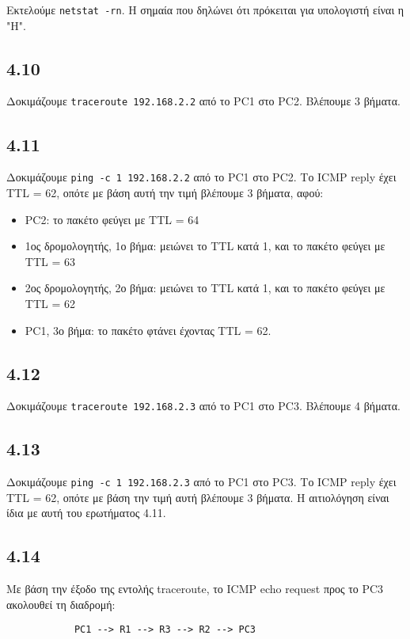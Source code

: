 \documentclass[a4paper, 12pt]{article}
\begin{document}
		Εκτελούμε \verb|netstat -rn|. Η σημαία που δηλώνει ότι πρόκειται για υπολογιστή είναι η "H".

	\subsection*{4.10}
		Δοκιμάζουμε \verb|traceroute 192.168.2.2| από το PC1 στο PC2. Βλέπουμε 3 βήματα.

	\subsection*{4.11}
		Δοκιμάζουμε \verb|ping -c 1 192.168.2.2| από το PC1 στο PC2. Το ICMP reply έχει TTL = 62, οπότε με βάση αυτή την τιμή βλέπουμε 3 βήματα, αφού:

		\begin{itemize}
			\item PC2: το πακέτο φεύγει με TTL = 64
			\item 1ος δρομολογητής, 1ο βήμα: μειώνει το TTL κατά 1, και το πακέτο φεύγει με TTL = 63
			\item 2ος δρομολογητής, 2ο βήμα: μειώνει το TTL κατά 1, και το πακέτο φεύγει με TTL = 62
			\item PC1, 3ο βήμα: το πακέτο φτάνει έχοντας TTL = 62.
		\end{itemize}
		
	\subsection*{4.12}
		Δοκιμάζουμε \verb|traceroute 192.168.2.3| από το PC1 στο PC3. Βλέπουμε 4 βήματα.

	\subsection*{4.13}
		Δοκιμάζουμε \verb|ping -c 1 192.168.2.3| από το PC1 στο PC3. Το ICMP reply έχει TTL = 62, οπότε με βάση την τιμή αυτή βλέπουμε 3 βήματα. Η αιτιολόγηση είναι ίδια με αυτή του ερωτήματος 4.11.

	\subsection*{4.14}
		Με βάση την έξοδο της εντολής traceroute, το ICMP echo request προς το PC3 ακολουθεί τη διαδρομή:
		
		\begin{verbatim}
			PC1 --> R1 --> R3 --> R2 --> PC3
		\end{verbatim}
\end{document}
